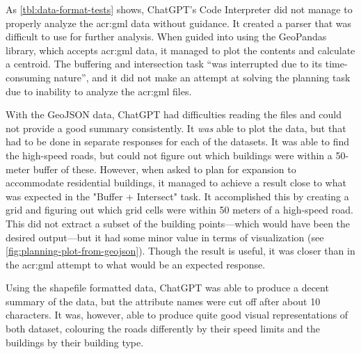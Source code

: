 As \autoref{tbl:data-format-tests} shows, ChatGPT's Code Interpreter did not manage to properly analyze the \acrshort{acr:gml} data without guidance. It created a parser that was difficult to use for further analysis. When guided into using the GeoPandas library, which accepts \acrshort{acr:gml} data, it managed to plot the contents and calculate a centroid. The buffering and intersection task \enquote{was interrupted due to its time-consuming nature}, and it did not make an attempt at solving the planning task due to inability to analyze the \acrshort{acr:gml} files.

With the GeoJSON data, ChatGPT had difficulties reading the files and could not provide a good summary consistently. It \textit{was} able to plot the data, but that had to be done in separate responses for each of the datasets. It was able to find the high-speed roads, but could not figure out which buildings were within a 50-meter buffer of these. However, when asked to plan for expansion to accommodate residential buildings, it managed to achieve a result close to what was expected in the "Buffer + Intersect" task. It accomplished this by creating a grid and figuring out which grid cells were within 50 meters of a high-speed road. This did not extract a subset of the building points---which would have been the desired output---but it had some minor value in terms of visualization (see \autoref{fig:planning-plot-from-geojson}). Though the result is useful, it was closer than in the \acrshort{acr:gml} attempt to what would be an expected response.

Using the shapefile formatted data, ChatGPT was able to produce a decent summary of the data, but the attribute names were cut off after about 10 characters. It was, however, able to produce quite good visual representations of both dataset, colouring the roads differently by their speed limits and the buildings by their building type.

